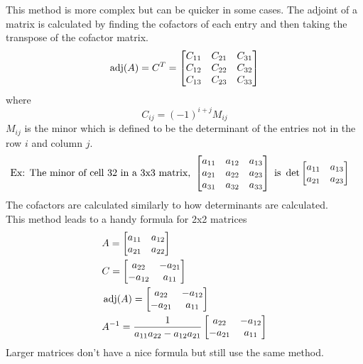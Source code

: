 \documentclass[11pt, fleqn]{article}
\begin{document}
This method is more complex but can be quicker in some cases.
The adjoint of a matrix is calculated by finding the cofactors of each entry and then taking the transpose of the cofactor matrix.
$$\adj(A)=C^T=\matrixx{C_{11}&C_{21}&C_{31}\\C_{12}&C_{22}&C_{32}\\C_{13}&C_{23}&C_{33}}$$
where
$$C_{ij}=(-1)^{i+j}M_{ij}$$
$M_{ij}$ is the minor which is defined to be the determinant of the entries not in the row $i$ and column $j$.
\begin{align*}
    \text{Ex: }&\text{The minor of cell $32$ in a 3x3 matrix, }\matrixx{a_{11}&a_{12}&a_{13}\\a_{21}&a_{22}&a_{23}\\a_{31}&a_{32}&a_{33}}\text{ is }\det\matrixx{a_{11}&a_{13}\\a_{21}&a_{23}}
\end{align*}
The cofactors are calculated similarly to how determinants are calculated.\\
This method leads to a handy formula for 2x2 matrices
\begin{align*}
    &A=\matrixx{a_{11}&a_{12}\\a_{21}&a_{22}}\\
    &C=\matrixx{a_{22}&-a_{21}\\-a_{12}&a_{11}}\\
    &\adj(A)=\matrixx{a_{22}&-a_{12}\\-a_{21}&a_{11}}\\
    &A^{-1}=\frac{1}{a_{11}a_{22}-a_{12}a_{21}}\matrixx{a_{22}&-a_{12}\\-a_{21}&a_{11}}
\end{align*}
Larger matrices don't have a nice formula but still use the same method.
\end{document}
